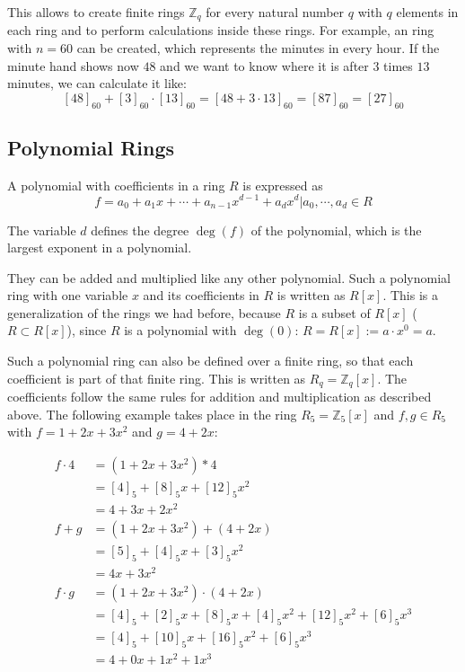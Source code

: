 This allows to create finite rings $\mathbb{Z}_q$ for every natural number $q$ with $q$ elements in each ring and to perform calculations inside these rings. For example, an ring with $n=60$ can be created, which represents the minutes in every hour. If the minute hand shows now $48$ and we want to know where it is after $3$ times $13$ minutes, we can calculate it like:
$$[48]_{60} + [3]_{60}\cdot [13]_{60} = [48+3\cdot 13]_{60} = [87]_{60} = [27]_{60}$$

\subsection*{Polynomial Rings}

A polynomial with coefficients in a ring $R$ is expressed as 
$$f = a_0+ a_1x+\cdots+ a_{n-1}x^{d-1}+a_dx^d | a_0, \cdots, a_d \in R$$

The variable $d$ defines the degree $\deg(f)$ of the polynomial, which is the largest exponent in a polynomial.

They can be added and multiplied like any other polynomial. Such a polynomial ring with one variable $x$ and its coefficients in $R$ is written as $R[x]$. This is a generalization of the rings we had before, because $R$ is a subset of $R[x]$ ($R \subset R[x]$), since $R$ is a polynomial with $\deg(0)$: $R = R[x] := a\cdot x^0 = a$.

Such a polynomial ring can also be defined over a finite ring, so that each coefficient is part of that finite ring. This is written as $R_q = \mathbb{Z}_q[x]$. The coefficients follow the same rules for addition and multiplication as described above. The following example takes place in the ring $R_5 = \mathbb{Z}_5[x]$ and $f, g \in R_5$ with $f=1+2x+3x^2$ and $g=4+2x$:

\begin{align*}
  f\cdot 4 & = (1+2x+3x^2) * 4                                 \\
           & = [4]_5+[8]_5x+[12]_5x^2                          \\
           & = 4+3x+2x^2                                       \\
  f+g      & = (1+2x+3x^2)+(4+2x)                              \\
           & = [5]_5+[4]_5x+[3]_5x^2                           \\
           & = 4x+3x^2                                         \\
  f\cdot g & = (1+2x+3x^2)\cdot(4+2x)                          \\ 
           & = [4]_5+[2]_5x+[8]_5x+[4]_5x^2+[12]_5x^2+[6]_5x^3 \\
           & = [4]_5+[10]_5x+[16]_5x^2+[6]_5x^3                \\
           & = 4+0x+1x^2+1x^3                                  \\
\end{align*}

